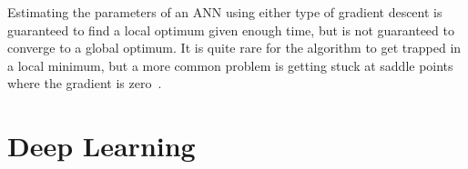 

Estimating the parameters of an \ac{ANN} using either type of gradient descent is guaranteed to find a local optimum given enough time, but is not guaranteed to converge to a global optimum.
It is quite rare for the algorithm to get trapped in a local minimum, but a more common problem is getting stuck at saddle points where the gradient is zero~\autocite[438]{lecun2015}.

\section{Deep Learning}\label{ch:deep-learning}

